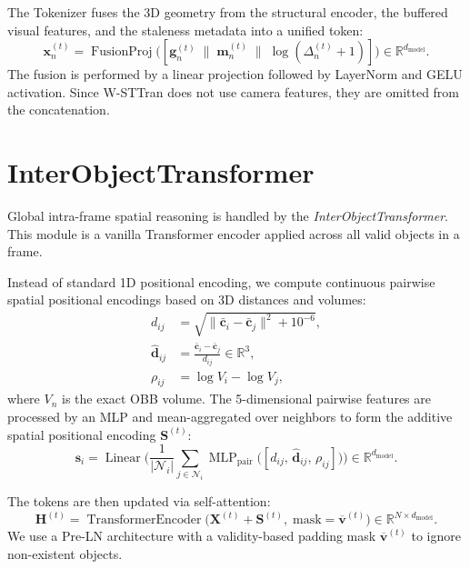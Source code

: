 \documentclass{article}
\newcommand{\mR}{\mathbb{R}}
\newcommand{\op}[1]{\operatorname{#1}}
\newcommand{\mat}[1]{\bm{#1}}
\begin{document}
The Tokenizer fuses the 3D geometry from the structural encoder, the buffered visual features, and the staleness metadata into a unified token:
\begin{equation}
    \mat{x}_n^{(t)} = \op{FusionProj}\bigl([\mat{g}_n^{(t)} \;\|\; \mat{m}_n^{(t)} \;\|\; \log(\Delta_n^{(t)} + 1)]\bigr) \in \mR^{d_{\text{model}}}.
    \label{eq:pwg_tokenizer}
\end{equation}
The fusion is performed by a linear projection followed by LayerNorm and GELU activation. Since W-STTran does not use camera features, they are omitted from the concatenation.


\section{InterObjectTransformer}
\label{sec:iot}

Global intra-frame spatial reasoning is handled by the \emph{InterObjectTransformer}. This module is a vanilla Transformer encoder applied across all valid objects in a frame.

Instead of standard 1D positional encoding, we compute continuous pairwise spatial positional encodings based on 3D distances and volumes:
\begin{align}
    d_{ij} &= \sqrt{\|\bar{\mat{c}}_i - \bar{\mat{c}}_j\|^2 + 10^{-6}}, \label{eq:dist} \\
    \hat{\mat{d}}_{ij} &= \frac{\bar{\mat{c}}_i - \bar{\mat{c}}_j}{d_{ij}} \in \mR^{3}, \label{eq:dir} \\
    \rho_{ij} &= \log V_i - \log V_j, \label{eq:volratio}
\end{align}
where $V_n$ is the exact OBB volume. The 5-dimensional pairwise features are processed by an MLP and mean-aggregated over neighbors to form the additive spatial positional encoding $\mat{S}^{(t)}$:
\begin{equation}
    \mat{s}_i = \op{Linear}\Bigg(\frac{1}{|\mathcal{N}_i|}\sum_{j \in \mathcal{N}_i}\op{MLP}_{\text{pair}}\bigl([d_{ij},\,\hat{\mat{d}}_{ij},\,\rho_{ij}]\bigr)\Bigg) \in \mR^{d_{\text{model}}}.
    \label{eq:spe}
\end{equation}

The tokens are then updated via self-attention:
\begin{equation}
    \mat{H}^{(t)} = \op{TransformerEncoder}\bigl(\mat{X}^{(t)} + \mat{S}^{(t)},\; \text{mask}=\overline{\mat{v}}^{(t)}\bigr) \in \mR^{N \times d_{\text{model}}}.
    \label{eq:iot_attn}
\end{equation}
We use a Pre-LN architecture with a validity-based padding mask $\overline{\mat{v}}^{(t)}$ to ignore non-existent objects.
\end{document}
